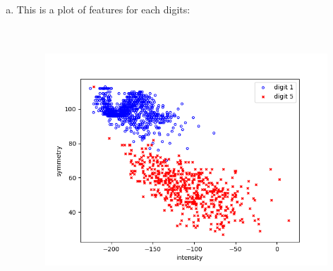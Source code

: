 \documentclass[11pt]{article}
\begin{document}
\begin{enumerate} [(a)]
	\item This is a plot of features for each digits:\\
	\begin{figure}[htb]
		{\includegraphics[height=10cm]{features.png}}
	\end{figure}
\end{enumerate}
\end{document}
